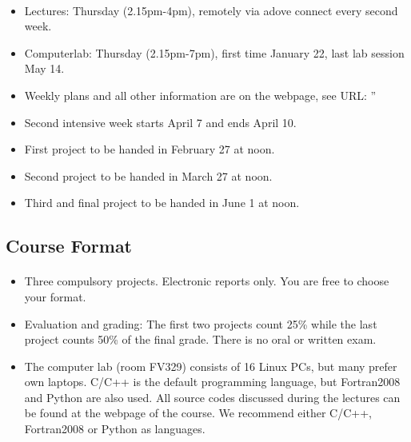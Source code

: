 \documentclass[%
twoside,                 %
final,                   %
10pt]{article}
\begin{document}
\paragraph{}
\begin{itemize}
  \item Lectures: Thursday (2.15pm-4pm), remotely via adove connect every second week.

  \item Computerlab: Thursday (2.15pm-7pm), first time January 22, last lab session May 14.

  \item Weekly plans and all other information are on the webpage, see URL: ''

  \item Second intensive week starts April 7 and ends April 10.

  \item First project to be handed in February 27 at noon.

  \item Second project to be handed in March 27 at noon.

  \item Third and final project to be handed in June 1 at noon. 
\end{itemize}

\noindent



\subsection*{Course Format}


\paragraph{}
\begin{itemize}
  \item Three  compulsory projects. Electronic reports only. You are free to choose your format.

  \item Evaluation and grading: The first two projects count 25\% while the last project counts 50\% of the final grade. There is no oral or written exam.

  \item The computer lab (room FV329) consists of 16 Linux PCs, but many prefer own laptops. C/C++ is the default programming language, but Fortran2008 and Python are also used. All source codes discussed during the lectures can be found at the webpage of the course. We recommend either C/C++, Fortran2008 or Python as languages.
\end{itemize}
\end{document}
